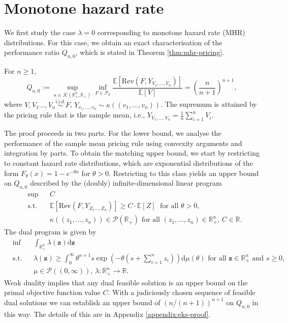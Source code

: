 \documentclass[11pt]{article}
\newcommand{\E}{\mathbb{E}}
\newcommand{\Rplus}{\mathbb{R}_+}
\newcommand{\iid}{\overset{\text{i.i.d.}}{\sim}}
\newcommand{\dd}{\mathrm{d}}
\newcommand{\Rev}{\mathrm{Rev}}
\newcounter{theorempart}[theorem]
\begin{document}
\section{Monotone hazard rate}
\label{sec:mhr}
We first study the case $\lambda=0$ corresponding to monotone hazard rate (MHR) distributions.
For this case, we obtain an exact characterisation of the performance ratio $Q_{n,0}$, which is stated in Theorem \ref{thm:mhr-pricing}. 


\begin{theorem}
\label{thm:mhr-pricing}
	For $n\ge 1$, 
$$
Q_{n,0}:=\sup_{\kappa\in \mathcal{K}(\Rplus^n,\Rplus)}\inf_{F\in\mathcal{P}_0}\frac{\E[\Rev(F,Y_{V_1,\dots,V_n})]}{\E[V]}=\left(\frac{n}{n+1}\right)^{n+1},
$$
where $V,V_1\dots,V_n\iid F$, $Y_{v_1,\dots,v_n}\sim\kappa((v_1,\dots,v_n))$. The supremum is attained by the pricing rule that is the sample mean, i.e., $Y_{V_1,\dots,V_n} = \frac{1}{n}\sum_{i=1}^n V_i$.
	\label{thm:mhr-pricing-rule} 
    	\label{thm:mhr-pricing-impossibility} 
\end{theorem}

The proof proceeds in two parts.
For the lower bound, we analyse the performance of the sample mean pricing rule using convexity arguments and integration by parts.
To obtain the matching upper bound, we start by restricting to 
constant hazard rate distributions, which are exponential distributions of the form $F_\theta(x)=1-e^{-\theta x}$ for $\theta > 0$. Restricting to this class yields an upper bound on $Q_{n,0}$ described by the (doubly) infinite-dimensional linear program
    \begin{align*}
        &\sup && C\\
        &\text{s.t.} &&\E[\Rev(F,Y_{Z_1\dots,Z_n})]\ge C \cdot \E[Z] \; \text{ for all } \theta>0,
        \\
        &&& \kappa((z_1,\dots,z_n))\in\mathcal{P}(\mathbb{R}_+)\text{ for all }(z_1,\dots,z_n)\in\mathbb{R}_+^n\text{, } C\in\mathbb{R}.
    \end{align*}
\noindent The dual program is given by
    \begin{align*}
        &\inf && \int_{\mathbb{R}_+^n}\lambda(\boldsymbol{z})\dd \boldsymbol{z}\\
        &\text{s.t.} &&
        \lambda(\boldsymbol{z})\ge\int_0^\infty \theta^{n+1}s\exp\left(-\theta\left(s+\sum_{i=1}^nz_i\right)\right)\dd \mu(\theta)\text{ for all }\boldsymbol{z}\in\mathbb{R}_+^n\text{ and }s\ge 0,
        \\
        &&& \mu\in\mathcal{P}((0,\infty))\text{, } \lambda:\mathbb{R}_+^n\to\mathbb{R}.
    \end{align*} 
Weak duality implies that any dual feasible solution is an upper bound on the primal objective function value $C$. With a judiciously chosen sequence of feasible dual solutions we can establish an upper bound of $\left(n/(n+1)\right)^{n+1}$ on $Q_{n,0}$ in this way.
The details of this are in Appendix \ref{appendix:eks-proof}. 
\end{document}
